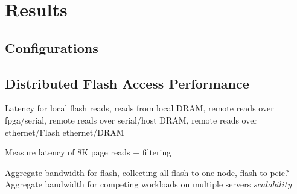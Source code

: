 \section{Results}
\subsection{Configurations}

\subsection{Distributed Flash Access Performance}
Latency for local flash reads, reads from local DRAM, remote reads over
fpga/serial, remote reads over serial/host DRAM, remote reads over
ethernet/Flash ethernet/DRAM

Measure latency of 8K page reads + filtering 

Aggregate bandwidth for flash, collecting all flash to one node, flash to pcie?
Aggregate bandwidth for competing workloads on multiple servers \(scalability\)
